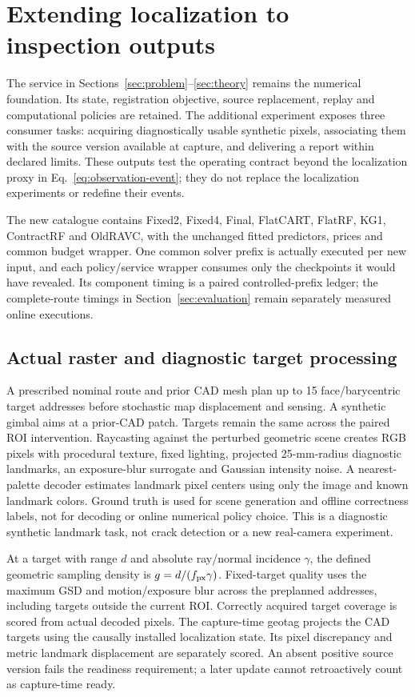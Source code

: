 \section{Extending localization to inspection outputs}\label{sec:r9-executor}
The service in Sections~\ref{sec:problem}--\ref{sec:theory} remains the numerical foundation. Its state, registration objective, source replacement, replay and computational policies are retained. The additional experiment exposes three consumer tasks: acquiring diagnostically usable synthetic pixels, associating them with the source version available at capture, and delivering a report within declared limits. These outputs test the operating contract beyond the localization proxy in Eq.~\eqref{eq:observation-event}; they do not replace the localization experiments or redefine their events.

The new catalogue contains Fixed2, Fixed4, Final, FlatCART, FlatRF, KG1, ContractRF and OldRAVC, with the unchanged fitted predictors, prices and common budget wrapper. One common solver prefix is actually executed per new input, and each policy/service wrapper consumes only the checkpoints it would have revealed. Its component timing is a paired controlled-prefix ledger; the complete-route timings in Section~\ref{sec:evaluation} remain separately measured online executions.

\subsection{Actual raster and diagnostic target processing}
A prescribed nominal route and prior CAD mesh plan up to 15 face/barycentric target addresses before stochastic map displacement and sensing. A synthetic gimbal aims at a prior-CAD patch. Targets remain the same across the paired ROI intervention. Raycasting against the perturbed geometric scene creates RGB pixels with procedural texture, fixed lighting, projected 25-mm-radius diagnostic landmarks, an exposure-blur surrogate and Gaussian intensity noise. A nearest-palette decoder estimates landmark pixel centers using only the image and known landmark colors. Ground truth is used for scene generation and offline correctness labels, not for decoding or online numerical policy choice. This is a diagnostic synthetic landmark task, not crack detection or a new real-camera experiment.

At a target with range $d$ and absolute ray/normal incidence $\gamma$, the defined geometric sampling density is $g=d/(f_{\rm px}\gamma)$. Fixed-target quality uses the maximum GSD and motion/exposure blur across the preplanned addresses, including targets outside the current ROI. Correctly acquired target coverage is scored from actual decoded pixels. The capture-time geotag projects the CAD targets using the causally installed localization state. Its pixel discrepancy and metric landmark displacement are separately scored. An absent positive source version fails the readiness requirement; a later update cannot retroactively count as capture-time ready.

